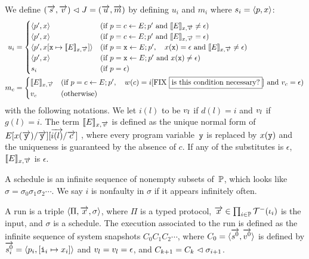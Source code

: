 {We define $
(\overrightarrow s, \overrightarrow v) \vartriangleleft J = (\overrightarrow u, \overrightarrow m)
$ by defining
$u_i$ and $m_i$
where $s_i = \langle{p,x}\rangle$:
\begin{align*}
 u_i & =
 \begin{cases}
 \langle{p',x}\rangle  & (\text{if } p = c
 \leftarrow E; p' \text{ and }\llbracket{E}\rrbracket_{x,\overrightarrow v} \neq \epsilon)
 \\
 \langle{p',x}\rangle  & (\text{if } p = c
 \leftarrow E; p' \text{ and }\llbracket{E}\rrbracket_{x,\overrightarrow v} = \epsilon)
 \\
 \langle{p', x[\texttt{x} \mapsto \llbracket{E}\rrbracket_{x, \overrightarrow v}]}\rangle&
                       (\text{if } p = \texttt{x} \leftarrow E; p', \quad
 x(\texttt{x}) = \epsilon  \text{ and } \llbracket{E}\rrbracket_{x, \overrightarrow v} \neq \epsilon) \\
 \langle{p', x}\rangle & (\text{if } p = \texttt{x} \leftarrow E; p' \text{
 and }
 x(\texttt{x}) \neq \epsilon) \\
 s_i & (\text{if } p = \epsilon)
 \end{cases}\\
 {m}_{c} & =
 \begin{cases}
 \llbracket{E}\rrbracket_{x, \overrightarrow v} & (\text{if } p = c \leftarrow E; p',\quad w(c)= i
  \text{[FIX \fbox{is this condition necessary?}]
 and } {v}_{c} = \epsilon) \\
 {v}_{c} &(\text{otherwise})
 \end{cases}\\
\end{align*}
with the following notations.
We let $i(l)$ to be ${v}_{l}$ if $d(l)=i$ and
${v}_{l}$ if $g(l) = i$.
The term
$\llbracket{E}\rrbracket_{x, \overrightarrow v}$ is defined as the unique normal form
of $E[x(\overrightarrow{\texttt{y}}) / \overrightarrow{\texttt{y}}][\overrightarrow{i(l)}/\overrightarrow c]$ , where
every program variable~$\texttt{y}$ is replaced by $x(\texttt{y})$ and the
uniqueness is guaranteed by the absence of $c$.
If any of the substitutes is $\epsilon$,
$\llbracket{E}\rrbracket_{x, \overrightarrow v}$ is $\epsilon$.

A schedule is an infinite sequence of nonempty subsets of~$\mathbb{P}$,
which looks like $\sigma = \sigma_0\sigma_1\sigma_2\cdots$.
We say $i$ is nonfaulty in $\sigma$
if it appears infinitely often.

A run is a triple $\langle{\Pi, \overrightarrow x, \sigma}\rangle$,
where $\Pi$ is a typed protocol,
$\overrightarrow x \in \prod_{i\in \mathbb{P}} \mathcal{T}^-(\iota_i)$ is the input,
and $\sigma$ is a schedule.
The execution associated to the run
is defined as the infinite sequence of system snapshots
$C_0C_1C_2\cdots$, where $C_0 = \langle{\overrightarrow{s^0}, \overrightarrow{v^0}}\rangle$ is
defined by $\overrightarrow{s^0_i} = \langle{p_i, [\texttt{i}_i\mapsto x_i]}\rangle$ and
${v}_{l}  = {v}_{l} = \epsilon$,
and $C_{k+1} = C_{k}\vartriangleleft
\sigma_{i+1}$.

}
